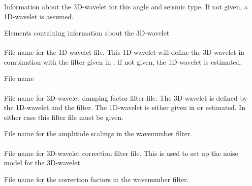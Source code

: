 \subsubsection{}
 \slist
   \item \Description Information about the 3D-wavelet for this angle and seismic type. If not given, a 1D-wavelet is assumed.
   \item \Argument Elements containing information about the 3D-wavelet
   \item \Default
 \elist

\paragraph{}
 \slist
   \item \Description File name for the 1D-wavelet file. This 1D-wavelet will define the 3D-wavelet in combination with the filter given in . If not given, the 1D-wavelet is estimated.
   \item \Argument File name
   \item \Default
 \elist

\paragraph{}
 \slist
   \item \Description File name for 3D-wavelet damping factor filter file. The 3D-wavelet is defined by the 1D-wavelet and the filter. The 1D-wavelet is either given in  or estimated. In either case this filter file must be given.
   \item \Argument File name for the amplitude scalings in the wavenumber filter.
   \item \Default
 \elist

\paragraph{}
 \slist
   \item \Description File name for 3D-wavelet correction filter file. This is used to set up the noise model for the 3D-wavelet.
   \item \Argument File name for the correction factors in the wavenumber filter.
   \item \Default
 \elist


